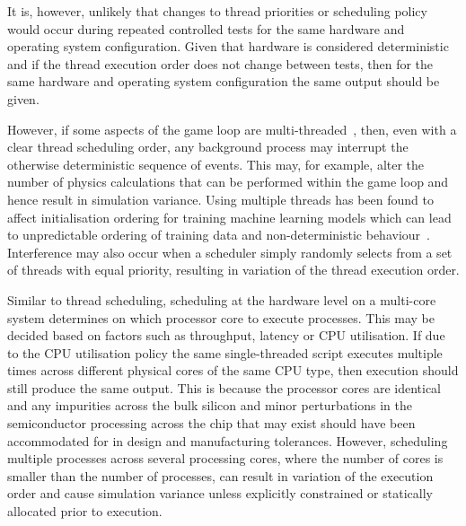 \documentclass[letterpaper, 10 pt, journal, twoside]{IEEEtran}
\begin{document}
It is, however, unlikely that changes to thread priorities or scheduling policy would occur during repeated controlled tests for the same hardware and operating system configuration. Given that hardware is considered deterministic and if the thread execution order does not change between tests, then for the same hardware and operating system configuration the same output should be given.  

However, if some aspects of the game loop are multi-threaded~\cite{unity_multithreading}, then, even with a clear thread scheduling order, any background process may interrupt the otherwise deterministic sequence of events. This may, for example, alter the number of physics calculations that can be performed within the game loop and hence result in simulation variance.
%
Using multiple threads has been found to affect initialisation ordering for training machine learning models which can lead to unpredictable ordering of training data and non-deterministic behaviour~\cite{Sculley2015,Breck2017}.
%
%
Interference may also occur when a scheduler simply randomly selects from a set of threads with equal priority, resulting in variation of the thread execution order.

Similar to thread scheduling, scheduling at the hardware level on a multi-core system determines on which processor core to execute processes. This may be decided based on factors such as throughput, latency or CPU utilisation. 
%
If due to the CPU utilisation policy the same single-threaded script executes multiple times across different physical cores of the same CPU type,  then execution should still produce the same output. 
%
This is because the processor cores are identical and any impurities across the bulk silicon and minor perturbations in the semiconductor processing across the chip that may exist should have been accommodated for in design and manufacturing tolerances.
%
However, scheduling multiple processes across several processing cores, where the number of cores is smaller than the number of processes, can result in variation of the execution order and cause simulation variance unless explicitly constrained or statically allocated prior to execution. 
\end{document}

